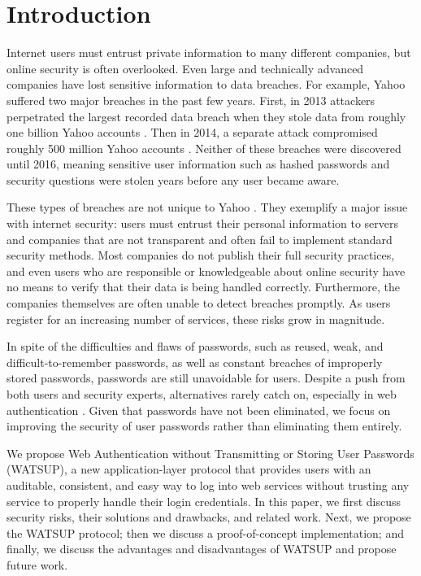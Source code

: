\section{Introduction}
\label{sec:intro}

Internet users must entrust private information to many different companies, but online security is often overlooked. Even large and technically advanced companies have lost sensitive information to data breaches. For example, Yahoo suffered two major breaches in the past few years. First, in 2013 attackers perpetrated the largest recorded data breach when they stole data from roughly one billion Yahoo accounts \cite{Thielman:2016}. Then in 2014, a separate attack compromised roughly 500 million Yahoo accounts \cite{Fiegerman:2016}. Neither of these breaches were discovered until 2016, meaning sensitive user information such as hashed passwords and security questions were stolen years before any user became aware.

These types of breaches are not unique to Yahoo \cite{Hunt:2016, Tabachnik:2016}. They exemplify a major issue with internet security: users must entrust their personal information to servers and companies that are not transparent and often fail to implement standard security methods. Most companies do not publish their full security practices, and even users who are responsible or knowledgeable about online security have no means to verify that their data is being handled correctly. Furthermore, the companies themselves are often unable to detect breaches promptly. As users register for an increasing number of services, these risks grow in magnitude.

In spite of the difficulties and flaws of passwords, such as reused, weak, and difficult-to-remember passwords, as well as constant breaches of improperly stored passwords, passwords are still unavoidable for users. Despite a push from both users and security experts, alternatives rarely catch on, especially in web authentication \cite{Herley:2011}. Given that passwords have not been eliminated, we focus on improving the security of user passwords rather than eliminating them entirely.

We propose Web Authentication without Transmitting or Storing User Passwords (WATSUP), a new application-layer protocol that provides users with an auditable, consistent, and easy way to log into web services without trusting any service to properly handle their login credentials. In this paper, we first discuss security risks, their solutions and drawbacks, and related work. Next, we propose the WATSUP protocol; then we discuss a proof-of-concept implementation; and finally, we discuss the advantages and disadvantages of WATSUP and propose future work.
